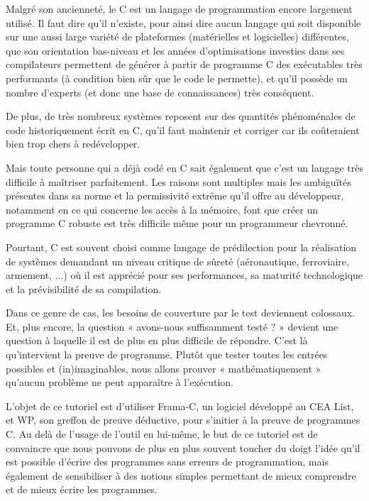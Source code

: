 \newpage


Malgré son ancienneté, le C est un langage de programmation encore largement 
utilisé. Il faut dire qu'il n'existe, pour ainsi dire aucun langage qui soit 
disponible sur une aussi large variété de plateformes (matérielles et 
logicielles) différentes, que son orientation bas-niveau et les années 
d'optimisations investies dans ses compilateurs permettent de générer à 
partir de programme C des exécutables très performants (à condition bien sûr 
que le code le permette), et qu'il possède un nombre d'experts (et donc une 
base de connaissances) très conséquent.



De plus, de très nombreux systèmes reposent sur des quantités phénoménales de
code historiquement écrit en C, qu'il faut maintenir et corriger car ils 
coûteraient bien trop chers à redévelopper.



Mais toute personne qui a déjà codé en C sait également que c'est un langage 
très difficile à maîtriser parfaitement. Les raisons sont multiples mais les 
ambiguïtés présentes dans sa norme et la permissivité extrême qu'il offre au 
développeur, notamment en ce qui concerne les accès à la mémoire, font que 
créer un programme C robuste est très difficile même pour un programmeur 
chevronné.



Pourtant, C est souvent choisi comme langage de prédilection pour la 
réalisation de systèmes demandant un niveau critique de sûreté (aéronautique, 
ferroviaire, armement, ...) où il est apprécié pour ses performances, sa 
maturité technologique et la prévisibilité de sa compilation.



Dans ce genre de cas, les besoins de couverture par le test deviennent 
colossaux. Et, plus encore, la question « avons-nous suffisamment testé ? » 
devient une question à laquelle il est de plus en plus difficile de répondre.
C'est là qu'intervient la preuve de programme. Plutôt que tester toutes les 
entrées possibles et (in)imaginables, nous allons prouver « mathématiquement »
qu'aucun problème ne peut apparaître à l'exécution.



L'objet de ce tutoriel est d'utiliser Frama-C, un logiciel développé au 
CEA List, et WP, son greffon de preuve déductive, pour s'initier à la preuve 
de programmes C. Au delà de l'usage de l'outil en lui-même, le but de ce tutoriel
est de convaincre que nous pouvons de plus en plus souvent toucher du 
doigt l'idée qu'il est possible d'écrire des programmes sans erreurs de 
programmation, mais également de sensibiliser à des notions simples 
permettant de mieux comprendre et de mieux écrire les programmes.



